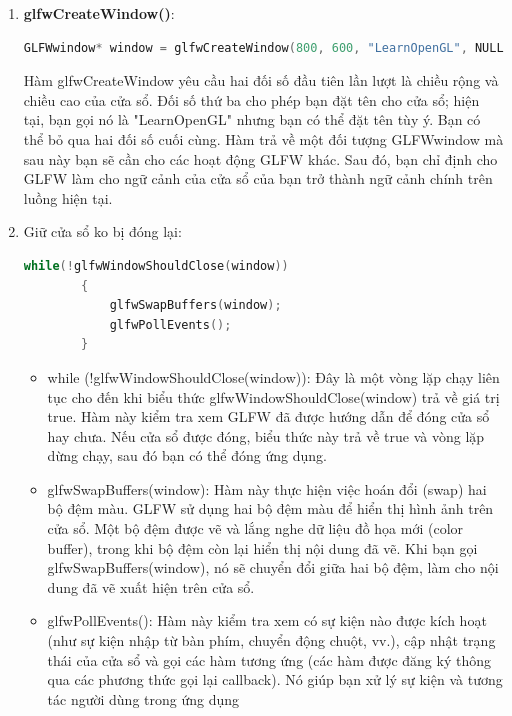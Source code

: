 \begin{enumerate}
   \item \textbf {glfwCreateWindow()}:
   \begin{lstlisting}[language=C++]
    GLFWwindow* window = glfwCreateWindow(800, 600, "LearnOpenGL", NULL, NULL);
   \end{lstlisting}
   Hàm glfwCreateWindow yêu cầu hai đối số đầu tiên lần lượt 
   là chiều rộng và chiều cao của cửa sổ. Đối số thứ ba 
   cho phép bạn đặt tên cho cửa sổ; hiện tại, bạn gọi nó là 
   "LearnOpenGL" nhưng bạn có thể đặt tên tùy ý. Bạn có thể bỏ 
   qua hai đối số cuối cùng. Hàm trả về một đối tượng GLFWwindow mà
    sau này bạn sẽ cần cho các hoạt động GLFW khác. Sau đó, bạn chỉ 
    định cho GLFW làm cho ngữ cảnh của cửa sổ của 
   bạn trở thành ngữ cảnh chính trên luồng hiện tại.
   \item Giữ cửa sổ ko bị đóng lại:
    \begin{lstlisting}[language=C++]
        while(!glfwWindowShouldClose(window))
        {
            glfwSwapBuffers(window);
            glfwPollEvents();    
        }
    \end{lstlisting}
      \begin{itemize}
        \item while (!glfwWindowShouldClose(window)): Đây là một
         vòng lặp chạy liên tục cho đến khi biểu thức
          glfwWindowShouldClose(window) trả về giá trị true.
           Hàm này kiểm tra xem GLFW đã được hướng dẫn để đóng cửa sổ hay 
           chưa. Nếu cửa sổ được đóng, biểu thức này trả về true và vòng 
        lặp dừng chạy, sau đó bạn có thể đóng ứng dụng.
        \item glfwSwapBuffers(window): Hàm này thực hiện việc hoán đổi
         (swap) hai bộ đệm màu. GLFW sử dụng hai bộ đệm màu để hiển 
         thị hình ảnh trên cửa sổ. Một bộ đệm được vẽ và lắng nghe dữ
          liệu đồ họa mới (color buffer), trong khi bộ đệm còn lại 
          hiển thị nội dung đã vẽ. Khi bạn gọi glfwSwapBuffers(window),
           nó sẽ chuyển đổi giữa hai bộ đệm, làm cho nội dung đã vẽ 
           xuất hiện trên cửa sổ.
        \item
        glfwPollEvents(): Hàm này kiểm tra xem có sự kiện nào được 
        kích hoạt (như sự kiện nhập từ bàn phím, chuyển động chuột, 
        vv.), cập nhật trạng thái của cửa sổ và gọi các hàm tương ứng 
        (các hàm được đăng ký thông qua các phương thức gọi lại callback).
         Nó giúp bạn xử lý sự kiện và tương tác người dùng trong ứng dụng

\end{itemize}
\end{enumerate}
